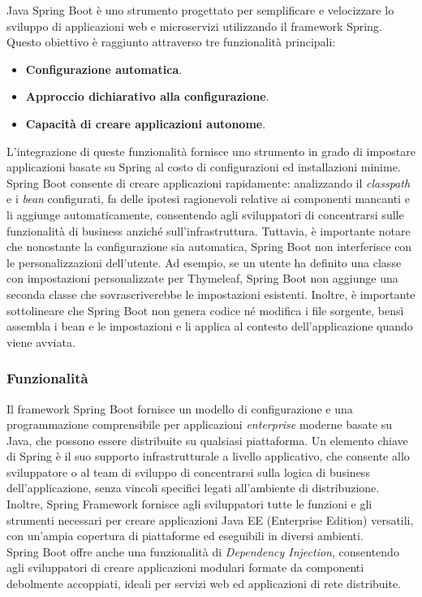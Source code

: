 Java Spring Boot è uno strumento progettato per semplificare e velocizzare lo sviluppo di applicazioni web e microservizi utilizzando il framework Spring. Questo obiettivo è raggiunto attraverso tre funzionalità principali:
\begin{itemize}
    \item \textbf{Configurazione automatica}.
    \item \textbf{Approccio dichiarativo alla configurazione}.
    \item \textbf{Capacità di creare applicazioni autonome}.
\end{itemize}
L'integrazione di queste funzionalità fornisce uno strumento in grado di impostare applicazioni basate su Spring al costo di configurazioni ed installazioni minime.
Spring Boot consente di creare applicazioni rapidamente: analizzando il \textit{classpath} e i \textit{bean} configurati, fa delle ipotesi ragionevoli relative ai componenti mancanti e li aggiunge automaticamente, consentendo agli sviluppatori di concentrarsi sulle funzionalità di business anziché sull'infrastruttura.\cite{SPRINGBOOT_techwithmaddy}\cite{SPRINGBOOT_spring}
Tuttavia, è importante notare che nonostante la configurazione sia automatica, Spring Boot non interferisce con le personalizzazioni dell'utente. Ad esempio, se un utente ha definito una classe con impostazioni personalizzate per Thymeleaf, Spring Boot non aggiunge una seconda classe che sovrascriverebbe le impostazioni esistenti.
Inoltre, è importante sottolineare che Spring Boot non genera codice né modifica i file sorgente, bensì assembla i bean e le impostazioni e li applica al contesto dell'applicazione quando viene avviata.\cite{SPRINGBOOT_spring2}

\subsubsection{Funzionalità}

Il framework Spring Boot fornisce un modello di configurazione e una programmazione comprensibile per applicazioni \textit{enterprise} moderne basate su Java, che possono essere distribuite su qualsiasi piattaforma.\cite{SPRINGBOOT_ibm} Un elemento chiave di Spring è il suo supporto infrastrutturale a livello applicativo, che consente allo sviluppatore o al team di sviluppo di concentrarsi sulla logica di business dell'applicazione, senza vincoli specifici legati all'ambiente di distribuzione.\\
Inoltre, Spring Framework fornisce agli sviluppatori tutte le funzioni e gli strumenti necessari per creare applicazioni Java EE (Enterprise Edition) versatili, con un'ampia copertura di piattaforme ed eseguibili in diversi ambienti.\\
Spring Boot offre anche una funzionalità di \textit{Dependency Injection}, consentendo agli sviluppatori di creare applicazioni modulari formate da componenti debolmente accoppiati, ideali per servizi web ed applicazioni di rete distribuite.

